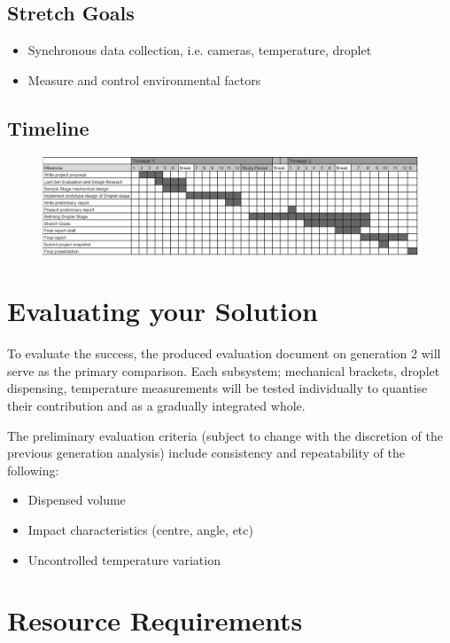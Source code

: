 \documentclass[11pt, a4paper, twoside, openright]{report}
\begin{document}
\subsection{Stretch Goals}
\begin{itemize}
  \item Synchronous data collection, i.e. cameras, temperature, droplet
  \item Measure and control environmental factors
\end{itemize}

\subsection{Timeline}
\begin{figure}[h]
  \centering
  \includegraphics[width=\textwidth]{Figures/Gantt-chart_filler.png}
\end{figure}

\newpage
\section{Evaluating your Solution}
To evaluate the success, the produced evaluation document on generation 2 will serve as the primary comparison. Each subsystem; mechanical brackets, droplet dispensing, temperature measurements will be tested individually to quantise their contribution and as a gradually integrated whole.

The preliminary evaluation criteria (subject  to change with the discretion of the previous generation analysis) include consistency and repeatability of the following:
\begin{itemize}
  \item Dispensed volume
  \item Impact characteristics (centre, angle, etc)
  \item Uncontrolled temperature variation
\end{itemize}



\section{Resource Requirements}
\end{document}
